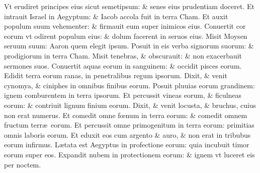\documentclass[a5paper,10pt]{book}
\def\ae{æ}
\def\oe{œ}
\begin{document}
\begin{multicols*}{2}
\newline \color{red} V\color{black}t erudiret principes eius sicut semetipsum: \& senes eius prudentiam doceret.
\newline \color{red} E\color{black}t intrauit Israel in Aegyptum: \& Iacob accola fuit in terra Cham.
\newline \color{red} E\color{black}t auxit populum suum vehementer: \& firmauit eum super inimicos eius.
\newline \color{red} C\color{black}onuertit cor eorum vt odirent populum eius: \& dolum facerent in seruos eius.
\newline \color{red} M\color{black}isit Moysen seruum suum: Aaron quem elegit ipsum.
\newline \color{red} P\color{black}osuit in eis verba signorum suorum: \& prodigiorum in terra Cham.
\newline \color{red} M\color{black}isit tenebras, \& obscurauit: \& non exacerbauit sermones suos.
\newline \color{red} C\color{black}onuertit aquas eorum in sanguinem: \& occidit pisces eorum.
\newline \color{red} E\color{black}didit terra eorum ranas, in penetralibus regum ipsorum.
\newline \color{red} D\color{black}ixit, \& venit cynomya, \& ciniphes in omnibus finibus eorum.
\newline \color{red} P\color{black}osuit pluuias eorum grandinem: ignem comburentem in terra ipsorum.
\newline \color{red} E\color{black}t percussit vineas eorum, \& ficulneas eorum: \& contriuit lignum finium eorum.
\newline \color{red} D\color{black}ixit, \& venit locusta, \& bruchus, cuius non erat numerus.
\newline \color{red} E\color{black}t comedit omne f\oe num in terra eorum: \& comedit omnem fructum terr\ae \ eorum.
\newline \color{red} E\color{black}t percussit omne primogenitum in terra eorum: primitias omnis laboris eorum.
\newline \color{red} E\color{black}t eduxit eos cum argento \& auro, \& non erat in tribubus eorum infirmus.
\newline \color{red} L\color{black}\ae tata est Aegyptus in profectione eorum: quia incubuit timor eorum super eos.
\newline \color{red} E\color{black}xpandit nubem in protectionem eorum: \& ignem vt luceret eis per noctem.

\end{multicols*}
\end{document}
